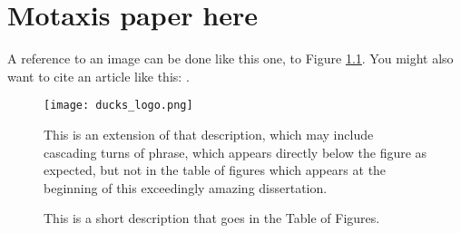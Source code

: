 \chapter{Motaxis paper here}

A reference to an image can be done like this one, to Figure \ref{ducks}. You might also want to cite an article like this: \cite{interesting_article}.

\begin{figure}[ht!]
\centering
\texttt{[image: ducks\_logo.png]}
\caption{\label{ducks}This is a short description that goes in the Table of Figures.}{This is an extension of that description, which may include cascading turns of phrase, which appears directly below the figure as expected, but not in the table of figures which appears at the beginning of this exceedingly amazing dissertation.}
\end{figure}